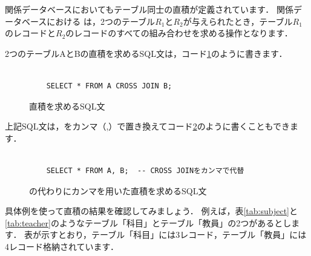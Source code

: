関係データベースにおいてもテーブル同士の直積が定義されています．
関係データベースにおける は，2つのテーブル$R_1$と$R_2$が与えられたとき，テーブル$R_1$のレコードと$R_2$のレコードのすべての組み合わせを求める操作となります．

2つのテーブルAとBの直積を求めるSQL文は，コード\ref{code:sql-cross-join}のように書きます．
\begin{figure}[!htbp]
    \begin{verbatim}

    SELECT * FROM A CROSS JOIN B;

    \end{verbatim}
    \captionsetup{name=コード}
    \caption{直積を求めるSQL文}
    \label{code:sql-cross-join}
\end{figure}
上記SQL文は，をカンマ（,）で置き換えてコード\ref{code:sql-cross-join2}のように書くこともできます．
\begin{figure}[!htbp]
    \begin{verbatim}

    SELECT * FROM A, B;  -- CROSS JOINをカンマで代替

    \end{verbatim}
    \captionsetup{name=コード}
    \caption{の代わりにカンマを用いた直積を求めるSQL文}
    \label{code:sql-cross-join2}
\end{figure}

具体例を使って直積の結果を確認してみましょう．
例えば，表\ref{tab:subject}と\ref{tab:teacher}のようなテーブル「科目」とテーブル「教員」の2つがあるとします．
表が示すとおり，テーブル「科目」には3レコード，テーブル「教員」には4レコード格納されています．
\begin{table}[!htbp]
    \centering
    \caption{科目テーブル}
    \label{tab:subject}
\end{table}
\begin{table}[!htbp]
    \centering
    \caption{教員テーブル}
    \label{tab:teacher}
\end{table}

